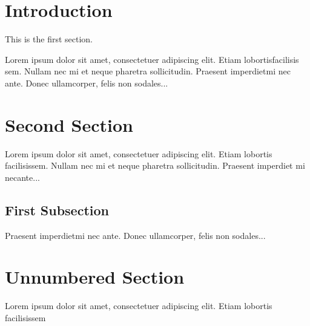 \documentclass[12pt]{article}
\begin{document}
\pagebreak

\cleardoublepage{}
\tableofcontents
\pagebreak





\section{Introduction}
 
This is the first \cite{knuth-acp} section. \cite{dirac}
 
Lorem  ipsum  dolor  sit  amet,  consectetuer  adipiscing  
elit.   Etiam  lobortisfacilisis sem.  Nullam nec mi et 
neque pharetra sollicitudin.  Praesent imperdietmi nec ante. 
Donec ullamcorper, felis non sodales...
 
\section{Second Section}
 
Lorem ipsum dolor sit amet, consectetuer adipiscing elit.  
Etiam lobortis facilisissem.  Nullam nec mi et neque pharetra 
sollicitudin.  Praesent imperdiet mi necante...

\subsection{First Subsection}
Praesent imperdietmi nec ante. Donec ullamcorper, felis non sodales...
 
\section*{Unnumbered Section}
Lorem ipsum dolor sit amet, consectetuer adipiscing elit.  
Etiam \cite{einstein} lobortis facilisissem





\end{document}
